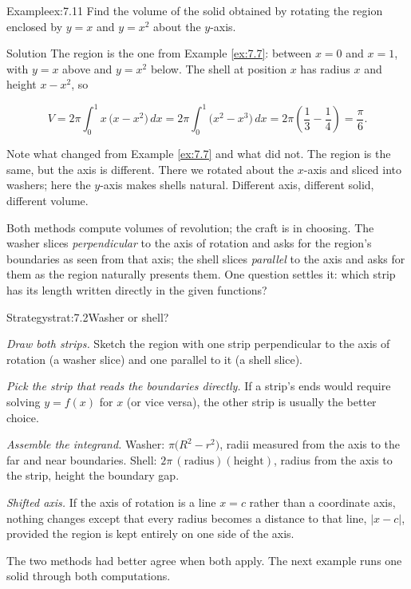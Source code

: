 \documentclass[a4paper,12pt,oneside]{memoir}
\begin{document}
\begin{workedexample}
\begin{envexample}{Example}{ex:7.11}{}
Find the volume of the solid obtained by rotating the region enclosed by \(y = x\) and \(y = x^{2}\) about the \(y\)-axis.
\end{envexample}
\begin{envsolution}{Solution}{}{}
The region is the one from Example \ref{ex:7.7}: between \(x = 0\) and \(x = 1\), with \(y = x\) above and \(y = x^{2}\) below. The shell at position \(x\) has radius \(x\) and height \(x - x^{2}\), so

\[ V = 2\pi \int_{0}^{1} x\,\bigl(x - x^{2}\bigr)\,dx = 2\pi \int_{0}^{1} \bigl(x^{2} - x^{3}\bigr)\,dx = 2\pi\left(\frac{1}{3} - \frac{1}{4}\right) = \frac{\pi}{6}. \]

Note what changed from Example \ref{ex:7.7} and what did not. The region is the same, but the axis is different. There we rotated about the \(x\)-axis and sliced into washers; here the \(y\)-axis makes shells natural. Different axis, different solid, different volume. \qedmark
\end{envsolution}
\end{workedexample}
Both methods compute volumes of revolution; the craft is in choosing. The washer slices \emph{perpendicular} to the axis of rotation and asks for the region’s boundaries as seen from that axis; the shell slices \emph{parallel} to the axis and asks for them as the region naturally presents them. One question settles it: which strip has its length written directly in the given functions?

\begin{envstrategy}{Strategy}{strat:7.2}{Washer or shell?}
\begin{steps}
  \item \emph{Draw both strips.} Sketch the region with one strip perpendicular to the axis of rotation (a washer slice) and one parallel to it (a shell slice).
  \item \emph{Pick the strip that reads the boundaries directly.} If a strip’s ends would require solving \(y = f(x)\) for \(x\) (or vice versa), the other strip is usually the better choice.
  \item \emph{Assemble the integrand.} Washer: \(\pi\bigl(R^{2} - r^{2}\bigr)\), radii measured from the axis to the far and near boundaries. Shell: \(2\pi\,(\text{radius})(\text{height})\), radius from the axis to the strip, height the boundary gap.
  \item \emph{Shifted axis.} If the axis of rotation is a line \(x = c\) rather than a coordinate axis, nothing changes except that every radius becomes a distance to that line, \(\lvert x - c\rvert\), provided the region is kept entirely on one side of the axis.
\end{steps}
\end{envstrategy}
The two methods had better agree when both apply. The next example runs one solid through both computations.
\end{document}
